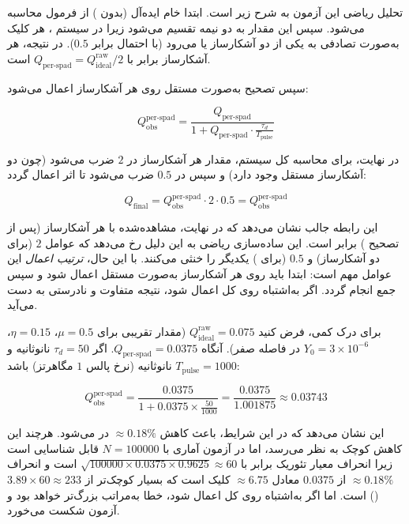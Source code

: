 تحلیل ریاضی این آزمون به شرح زیر است. ابتدا  خام ایده‌آل (بدون ) از فرمول  محاسبه می‌شود. سپس این مقدار به دو نیمه تقسیم می‌شود زیرا در سیستم ، هر کلیک به‌صورت تصادفی به یکی از دو آشکارساز  یا  می‌رود (با احتمال برابر $0.5$). در نتیجه،  هر آشکارساز برابر با $Q_{\text{per-spad}} = Q_{\text{ideal}}^{\text{raw}} / 2$ است.

سپس تصحیح  به‌صورت مستقل روی هر آشکارساز اعمال می‌شود:

\begin{equation}
	Q_{\text{obs}}^{\text{per-spad}} = \frac{Q_{\text{per-spad}}}{1 + Q_{\text{per-spad}} \cdot \frac{\tau_d}{T_{\text{pulse}}}}
\end{equation}

در نهایت، برای محاسبه  کل سیستم، مقدار هر آشکارساز در $2$ ضرب می‌شود (چون دو آشکارساز مستقل وجود دارد) و سپس در $0.5$ ضرب می‌شود تا اثر  اعمال گردد:

\begin{equation}
	Q_{\text{final}} = Q_{\text{obs}}^{\text{per-spad}} \cdot 2 \cdot 0.5 = Q_{\text{obs}}^{\text{per-spad}}
\end{equation}

این رابطه جالب نشان می‌دهد که در نهایت،  مشاهده‌شده با  هر آشکارساز (پس از تصحیح ) برابر است. این ساده‌سازی ریاضی به این دلیل رخ می‌دهد که عوامل $2$ (برای دو آشکارساز) و $0.5$ (برای ) یکدیگر را خنثی می‌کنند. با این حال، \emph{ترتیب اعمال} این عوامل مهم است: ابتدا باید  روی هر آشکارساز به‌صورت مستقل اعمال شود و سپس جمع انجام گردد. اگر به‌اشتباه  روی  کل اعمال شود، نتیجه متفاوت و نادرستی به دست می‌آید.

برای درک کمی، فرض کنید $Q_{\text{ideal}}^{\text{raw}} = 0.075$ (مقدار تقریبی برای $\mu = 0.5$، $\eta = 0.15$، $Y_0 = 3 \times 10^{-6}$ در فاصله صفر). آنگاه $Q_{\text{per-spad}} = 0.0375$. اگر $\tau_d = 50$ نانوثانیه و $T_{\text{pulse}} = 1000$ نانوثانیه (نرخ پالس $1$ مگاهرتز) باشد:

\begin{equation}
	Q_{\text{obs}}^{\text{per-spad}} = \frac{0.0375}{1 + 0.0375 \times \frac{50}{1000}} = \frac{0.0375}{1.001875} \approx 0.03743
\end{equation}

این نشان می‌دهد که در این شرایط،  باعث کاهش $\approx 0.18\%$ در  می‌شود. هرچند این کاهش کوچک به نظر می‌رسد، اما در آزمون آماری با $N = 100000$ قابل شناسایی است زیرا انحراف معیار تئوریک برابر با $\sqrt{100000 \times 0.0375 \times 0.9625} \approx 60$ است و انحراف $\approx 0.18\%$ از $0.0375$ معادل $\approx 6.75$ کلیک است که بسیار کوچک‌تر از $3.89 \times 60 \approx 233$ () است. اما اگر  به‌اشتباه روی کل  اعمال شود، خطا به‌مراتب بزرگ‌تر خواهد بود و آزمون شکست می‌خورد.

